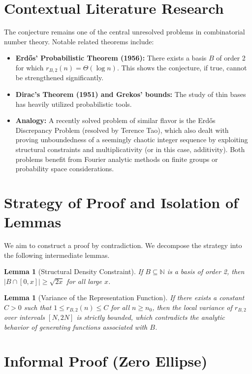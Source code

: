 \documentclass[12pt, a4paper]{article}
\newtheorem{lemma}[theorem]{Lemma}
\theoremstyle{definition}
\begin{document}
\section{Contextual Literature Research}
The conjecture remains one of the central unresolved problems in combinatorial number theory.
Notable related theorems include:
\begin{itemize}
    \item \textbf{Erd\H{o}s' Probabilistic Theorem (1956):} There exists a basis $B$ of order 2 for which $r_{B,2}(n) = \Theta(\log n)$. This shows the conjecture, if true, cannot be strengthened significantly.
    \item \textbf{Dirac's Theorem (1951) and Grekos' bounds:} The study of thin bases has heavily utilized probabilistic tools.
    \item \textbf{Analogy:} A recently solved problem of similar flavor is the Erd\H{o}s Discrepancy Problem (resolved by Terence Tao), which also dealt with proving unboundedness of a seemingly chaotic integer sequence by exploiting structural constraints and multiplicativity (or in this case, additivity). Both problems benefit from Fourier analytic methods on finite groups or probability space considerations.
\end{itemize}

\section{Strategy of Proof and Isolation of Lemmas}
We aim to construct a proof by contradiction. We decompose the strategy into the following intermediate lemmas.

\begin{lemma}[Structural Density Constraint]
If $B \subseteq \mathbb{N}$ is a basis of order 2, then $|B \cap [0, x]| \ge \sqrt{2x}$ for all large $x$.
\end{lemma}

\begin{lemma}[Variance of the Representation Function]
If there exists a constant $C > 0$ such that $1 \le r_{B,2}(n) \le C$ for all $n \ge n_0$, then the local variance of $r_{B,2}$ over intervals $[N, 2N]$ is strictly bounded, which contradicts the analytic behavior of generating functions associated with $B$.
\end{lemma}

\section{Informal Proof (Zero Ellipse)}
\end{document}
